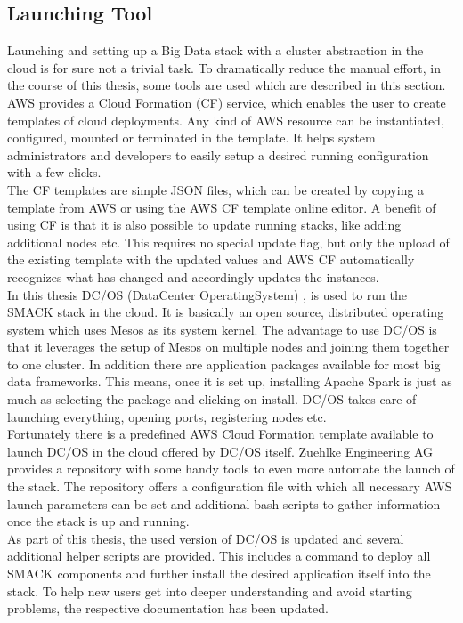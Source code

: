 \subsection{Launching Tool}
Launching and setting up a Big Data stack with a cluster abstraction in the cloud is for sure not a trivial task.
To dramatically reduce the manual effort, in the course of this thesis, some tools are used which are described in this section.
AWS provides a Cloud Formation (CF) service, which enables the user to create templates of cloud deployments.
Any kind of AWS resource can be instantiated, configured, mounted or terminated in the template.
It helps system administrators and developers to easily setup a desired running configuration with a few clicks.\\
The CF templates are simple JSON files, which can be created by copying a template from AWS or using the AWS CF template online editor.
A benefit of using CF is that it is also possible to update running stacks, like adding additional nodes etc.
This requires no special update flag, but only the upload of the existing template with the updated values and AWS CF automatically recognizes what has changed and accordingly updates the instances.\\

In this thesis DC/OS (DataCenter OperatingSystem) \cite{dcos}, is used to run the SMACK stack in the cloud.
It is basically an open source, distributed operating system which uses Mesos as its system kernel.
The advantage to use DC/OS is that it leverages the setup of Mesos on multiple nodes and joining them together to one cluster.
In addition there are application packages available for most big data frameworks.
This means, once it is set up, installing Apache Spark is just as much as selecting the package and clicking on install.
DC/OS takes care of launching everything, opening ports, registering nodes etc.\\

Fortunately there is a predefined AWS Cloud Formation template available to launch DC/OS in the cloud offered by DC/OS itself.
Zuehlke Engineering AG provides a repository \cite{shmack} with some handy tools to even more automate the launch of the stack.
The repository offers a configuration file with which all necessary AWS launch parameters can be set and additional bash scripts to gather information once the stack is up and running.\\
As part of this thesis, the used version of DC/OS is updated and several additional helper scripts are provided.
This includes a command to deploy all SMACK components and further install the desired application itself into the stack.
To help new users get into deeper understanding and avoid starting problems, the respective documentation has been updated.


